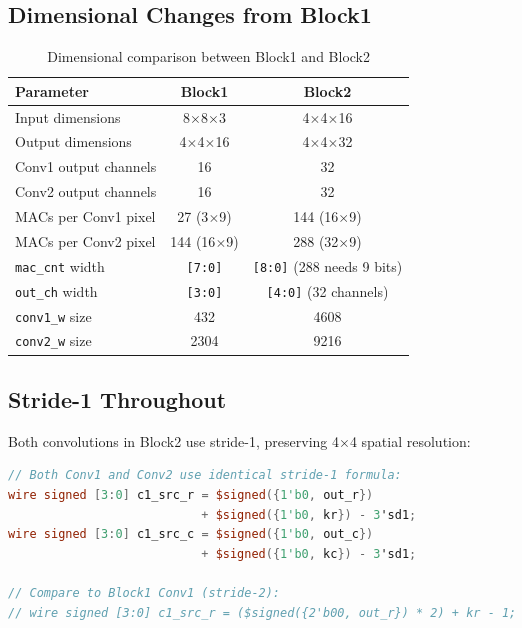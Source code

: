 \documentclass[11pt,a4paper]{report}
\newcommand{\regname}[1]{\texttt{\color{memorycolor}#1}}
\begin{document}
\subsection{Dimensional Changes from Block1}

\begin{table}[h]
\centering
\begin{tabular}{@{}lcc@{}}
\toprule
\textbf{Parameter} & \textbf{Block1} & \textbf{Block2} \\
\midrule
Input dimensions & 8$\times$8$\times$3 & 4$\times$4$\times$16 \\
Output dimensions & 4$\times$4$\times$16 & 4$\times$4$\times$32 \\
Conv1 output channels & 16 & 32 \\
Conv2 output channels & 16 & 32 \\
MACs per Conv1 pixel & 27 (3$\times$9) & 144 (16$\times$9) \\
MACs per Conv2 pixel & 144 (16$\times$9) & 288 (32$\times$9) \\
\regname{mac\_cnt} width & \texttt{[7:0]} & \texttt{[8:0]} (288 needs 9 bits) \\
\regname{out\_ch} width & \texttt{[3:0]} & \texttt{[4:0]} (32 channels) \\
\texttt{conv1\_w} size & 432 & 4608 \\
\texttt{conv2\_w} size & 2304 & 9216 \\
\bottomrule
\end{tabular}
\caption{Dimensional comparison between Block1 and Block2}
\end{table}

\subsection{Stride-1 Throughout}

Both convolutions in Block2 use stride-1, preserving 4$\times$4 spatial resolution:

\begin{lstlisting}[language=Verilog, caption={Block2 source coordinate calculation (stride-1)}]
// Both Conv1 and Conv2 use identical stride-1 formula:
wire signed [3:0] c1_src_r = $signed({1'b0, out_r}) 
                           + $signed({1'b0, kr}) - 3'sd1;
wire signed [3:0] c1_src_c = $signed({1'b0, out_c}) 
                           + $signed({1'b0, kc}) - 3'sd1;

// Compare to Block1 Conv1 (stride-2):
// wire signed [3:0] c1_src_r = ($signed({2'b00, out_r}) * 2) + kr - 1;
\end{lstlisting}
\end{document}
